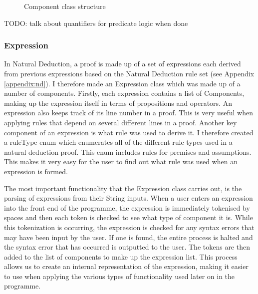 \begin{figure}[!ht]
	\centering
	\caption{Component class structure}
\end{figure}

TODO: talk about quantifiers for predicate logic when done

\subsubsection{Expression}

In Natural Deduction, a proof is made up of a set of expressions each derived from previous expressions based on the Natural Deduction rule set (see Appendix \ref{appendix:nd}). I therefore made an Expression class which was made up of a number of components. Firstly, each expression contains a list of Components, making up the expression itself in terms of propositions and operators. An expression also keeps track of its line number in a proof. This is very useful when applying rules that depend on several different lines in a proof. Another key component of an expression is what rule was used to derive it. I therefore created a ruleType enum which enumerates all of the different rule types used in a natural deduction proof. This enum includes rules for premises and assumptions. This makes it very easy for the user to find out what rule was used when an expression is formed.

The most important functionality that the Expression class carries out, is the parsing of expressions from their String inputs. When a user enters an expression into the front end of the programme,  the expression is immediately tokenised by spaces and then each token is checked to see what type of component it is. While this tokenization is occurring, the expression is checked for any syntax errors that may have been input by the user. If one is found, the entire process is halted and the syntax error that has occurred is outputted to the user. The tokens are then added to the list of components to make up the expression list. This process allows us to create an internal representation of the expression, making it easier to use when applying the various types of functionality used later on in the programme. 

